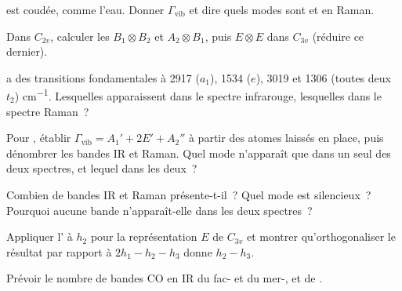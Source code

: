 \begin{exercise}[$\star$]\label{exo:b3:group-theory-applied:2}
 est coudée, comme l'eau. Donner $\Gamma_{\mathrm{vib}}$ et dire
quels modes sont  et en Raman.
\end{exercise}

\begin{exercise}[$\star$]\label{exo:b3:group-theory-applied:3}
Dans $C_{2v}$, calculer les  $B_1\otimes B_2$ et
$A_2\otimes B_1$, puis
$E\otimes E$ dans $C_{3v}$ (réduire ce dernier).
\end{exercise}

\begin{exercise}[$\star$]\label{exo:b3:group-theory-applied:4}
 a des transitions fondamentales à 2917 ($a_1$), 1534 ($e$), 3019
et 1306 (toutes deux $t_2$)
\unit{cm^{-1}}. Lesquelles apparaissent dans le spectre infrarouge,
lesquelles dans le spectre Raman~?
\end{exercise}

\begin{exercise}[$\star\star$]\label{exo:b3:group-theory-applied:5}
Pour , établir $\Gamma_{\mathrm{vib}} = A_1' + 2E' + A_2''$ à
partir des atomes laissés en
place, puis dénombrer les bandes IR et Raman. Quel mode n'apparaît que
dans un seul des deux spectres, et lequel dans les deux~?
\end{exercise}

\begin{exercise}[$\star\star$]\label{exo:b3:group-theory-applied:6}
Combien de bandes IR et Raman  présente-t-il~? Quel mode est
silencieux~? Pourquoi aucune bande n'apparaît-elle dans les deux
spectres~?
\end{exercise}

\begin{exercise}[$\star\star$]\label{exo:b3:group-theory-applied:7}
Appliquer l' à $h_2$ pour la représentation $E$ de
$C_{3v}$ et
montrer qu'orthogonaliser le résultat par rapport à $2h_1 - h_2 - h_3$
donne $h_2 - h_3$.
\end{exercise}

\begin{exercise}[$\star\star$]\label{exo:b3:group-theory-applied:8}
Prévoir le nombre de bandes CO en IR du fac- et du mer-, et
de .
\end{exercise}

